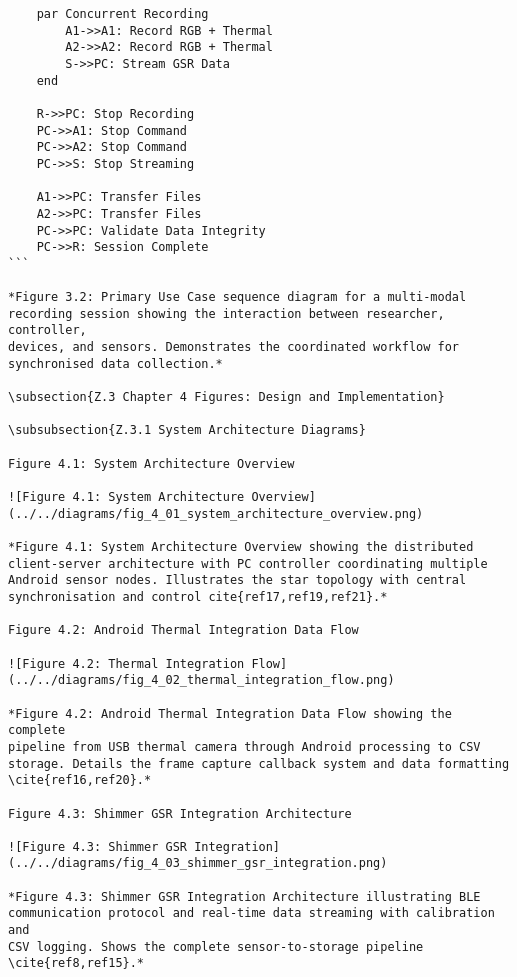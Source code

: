 \begin{verbatim}
    par Concurrent Recording
        A1->>A1: Record RGB + Thermal
        A2->>A2: Record RGB + Thermal
        S->>PC: Stream GSR Data
    end

    R->>PC: Stop Recording
    PC->>A1: Stop Command
    PC->>A2: Stop Command
    PC->>S: Stop Streaming

    A1->>PC: Transfer Files
    A2->>PC: Transfer Files
    PC->>PC: Validate Data Integrity
    PC->>R: Session Complete
```

*Figure 3.2: Primary Use Case sequence diagram for a multi-modal
recording session showing the interaction between researcher, controller,
devices, and sensors. Demonstrates the coordinated workflow for
synchronised data collection.*

\subsection{Z.3 Chapter 4 Figures: Design and Implementation}

\subsubsection{Z.3.1 System Architecture Diagrams}

Figure 4.1: System Architecture Overview

![Figure 4.1: System Architecture Overview](../../diagrams/fig_4_01_system_architecture_overview.png)

*Figure 4.1: System Architecture Overview showing the distributed
client-server architecture with PC controller coordinating multiple
Android sensor nodes. Illustrates the star topology with central
synchronisation and control cite{ref17,ref19,ref21}.*

Figure 4.2: Android Thermal Integration Data Flow

![Figure 4.2: Thermal Integration Flow](../../diagrams/fig_4_02_thermal_integration_flow.png)

*Figure 4.2: Android Thermal Integration Data Flow showing the complete
pipeline from USB thermal camera through Android processing to CSV
storage. Details the frame capture callback system and data formatting
\cite{ref16,ref20}.*

Figure 4.3: Shimmer GSR Integration Architecture

![Figure 4.3: Shimmer GSR Integration](../../diagrams/fig_4_03_shimmer_gsr_integration.png)

*Figure 4.3: Shimmer GSR Integration Architecture illustrating BLE
communication protocol and real-time data streaming with calibration and
CSV logging. Shows the complete sensor-to-storage pipeline \cite{ref8,ref15}.*


\end{verbatim}
